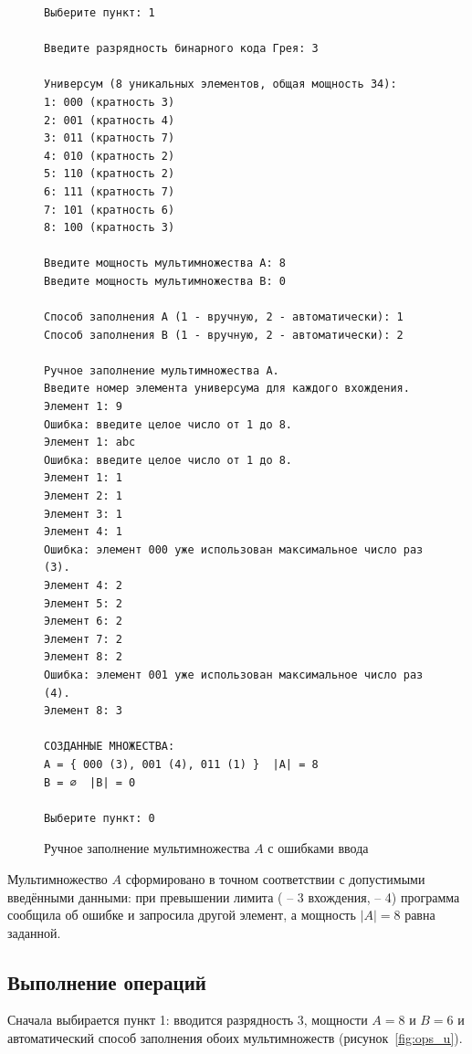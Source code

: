 \documentclass[14pt,a4paper]{extreport}
\newcommand{\card}[1]{\left|#1\right|}
\newcommand{\code}[1]{{\ttfamily #1}}
\begin{document}
\begin{figure}[H]
\begin{lstlisting}[numbers=none,frame=single]
Выберите пункт: 1

Введите разрядность бинарного кода Грея: 3

Универсум (8 уникальных элементов, общая мощность 34):
1: 000 (кратность 3)
2: 001 (кратность 4)
3: 011 (кратность 7)
4: 010 (кратность 2)
5: 110 (кратность 2)
6: 111 (кратность 7)
7: 101 (кратность 6)
8: 100 (кратность 3)

Введите мощность мультимножества A: 8
Введите мощность мультимножества B: 0

Способ заполнения A (1 - вручную, 2 - автоматически): 1
Способ заполнения B (1 - вручную, 2 - автоматически): 2

Ручное заполнение мультимножества A.
Введите номер элемента универсума для каждого вхождения.
Элемент 1: 9
Ошибка: введите целое число от 1 до 8.
Элемент 1: abc
Ошибка: введите целое число от 1 до 8.
Элемент 1: 1
Элемент 2: 1
Элемент 3: 1
Элемент 4: 1
Ошибка: элемент 000 уже использован максимальное число раз (3).
Элемент 4: 2
Элемент 5: 2
Элемент 6: 2
Элемент 7: 2
Элемент 8: 2
Ошибка: элемент 001 уже использован максимальное число раз (4).
Элемент 8: 3

СОЗДАННЫЕ МНОЖЕСТВА:
A = { 000 (3), 001 (4), 011 (1) }  |A| = 8
B = ∅  |B| = 0

Выберите пункт: 0
\end{lstlisting}
\caption{Ручное заполнение мультимножества $A$ с ошибками ввода}\label{fig:manual}
\end{figure}

Мультимножество $A$ сформировано в точном соответствии с допустимыми введёнными данными: при превышении лимита (\code{000} -- 3 вхождения, \code{001} -- 4) программа сообщила об ошибке и запросила другой элемент, а мощность $\card{A}=8$ равна заданной.

\subsection{Выполнение операций}

Сначала выбирается пункт 1: вводится разрядность 3, мощности $A=8$ и $B=6$ и автоматический способ заполнения обоих мультимножеств (рисунок~\ref{fig:ops_u}).
\end{document}
